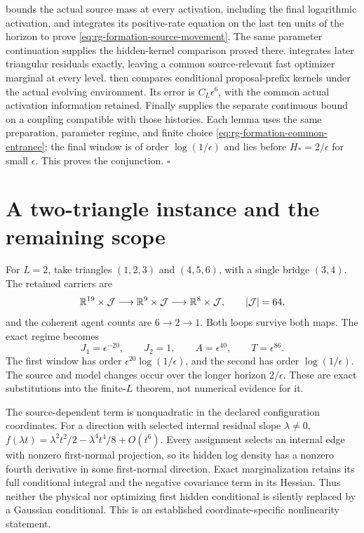  bounds the actual source mass
at every activation, including the final logarithmic activation, and
integrates its positive-rate equation on the last ten units of the
horizon to prove \cref{eq:rg-formation-source-movement}. The same
parameter continuation supplies the hidden-kernel comparison proved
there.  integrates later triangular
residuals exactly, leaving a common source-relevant fast optimizer
marginal at every level. 
then compares conditional proposal-prefix kernels under the actual
evolving environment. Its error is \(C_L\epsilon^6\), with the
common actual activation information retained. Finally
 supplies the separate
continuous bound on a coupling compatible with those histories.
Each lemma uses the same preparation, parameter regime, and finite
choice \cref{eq:rg-formation-common-entrance}; the final window is
of order \(\log(1/\epsilon)\) and lies before \(H_*=2/\epsilon\)
for small \(\epsilon\). This proves the conjunction. \(\square\)

\section{A two-triangle instance and the remaining scope}
\label{sec:rg-formation-example-scope}

For \(L=2\), take triangles \((1,2,3)\) and \((4,5,6)\), with a
single bridge \((3,4)\). The retained carriers are
\begin{equation}
\mathbb R^{19}\times\mathcal J
\longrightarrow\mathbb R^9\times\mathcal J
\longrightarrow\mathbb R^8\times\mathcal J,
\qquad |\mathcal J|=64,
\label{eq:rg-formation-two-triangle-carrier}
\end{equation}
and the coherent agent counts are \(6\to2\to1\).
Both loops survive both maps. The exact regime becomes
\begin{equation}
J_1=\epsilon^{-20},\qquad J_2=1,\qquad
A=\epsilon^{40},\qquad T=\epsilon^{86}.
\label{eq:rg-formation-two-triangle-regime}
\end{equation}
The first window has order
\(\epsilon^{20}\log(1/\epsilon)\), and the second has order
\(\log(1/\epsilon)\). The source and model changes occur over the
longer horizon \(2/\epsilon\). These are exact substitutions into
the finite-\(L\) theorem, not numerical evidence for it.

The source-dependent term is nonquadratic in the declared
configuration coordinates. For a direction with selected internal
residual slope \(\lambda\ne0\),
\(f(\lambda t)=\lambda^2t^2/2-\lambda^4t^4/8+O(t^6)\).
Every assignment selects an internal edge with nonzero first-normal
projection, so its hidden log density has a nonzero fourth derivative
in some first-normal direction. Exact marginalization retains its full
conditional integral and the negative covariance term in its Hessian.
Thus neither the physical nor optimizing first hidden conditional is
silently replaced by a Gaussian conditional. This is an established
coordinate-specific nonlinearity statement. 

